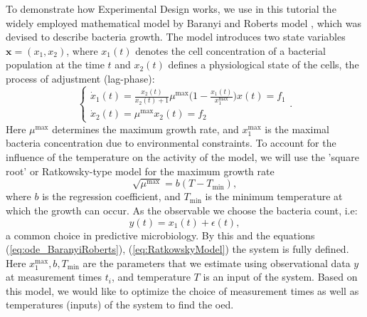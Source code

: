 \documentclass[10pt,A4paper]{article}
\newcommand{\mbx}{\mathbf{x}}
\begin{document}
To demonstrate how Experimental Design works, we use in this tutorial the widely employed mathematical model by Baranyi and Roberts model \cite{baranyiDynamicApproach1994}, which was devised to describe bacteria growth. 
The model introduces two state variables $\mbx = (x_1, x_2)$, where $x_1(t)$ denotes the cell concentration of a bacterial population at the time $t$ and $x_2(t)$ defines a physiological state of the cells, the process of adjustment (lag-phase):
\begin{equation}
    \begin{cases}
        \dot x_1(t) = \frac{x_2(t)}{x_2(t) + 1} \mu^\text{max} \big(1 - \frac{x_1(t)}{x_1^\text{max}}\big) x(t)  = f_1 \\
        \dot x_2(t) = \mu^\text{max}  x_2(t) = f_2
    \end{cases}.
    \label{eq:ode_BaranyiRoberts}
\end{equation}
Here $\mu^\text{max}$ determines the maximum growth rate, and $x_1^\text{max}$ is the maximal bacteria concentration due to environmental constraints. 
To account for the influence of the temperature on the activity of the model, we will use the 'square root' or Ratkowsky-type model for the maximum growth rate \cite{}
\begin{equation}
    \sqrt{\mu^\text{max}} = b (T - T_\text{min}),
    \label{eq:RatkowskyModel}
\end{equation} 
where $b$ is the regression coefficient, and $T_\text{min}$ is the minimum temperature at which the growth can occur. 
As the observable we choose the bacteria count, i.e:
\begin{equation}
    y(t) = x_1(t)+\epsilon(t),
 \end{equation} 
a common choice in predictive microbiology. 
By this and the equations (\ref{eq:ode_BaranyiRoberts}), (\ref{eq:RatkowskyModel}) the system is fully defined. 
Here $x_1^\text{max}, b, T_\text{min}$ are the parameters that we estimate using observational data $y$ at measurement times $t_i$, and temperature $T$ is an input of the system. 
Based on this model, we would like to optimize the choice of measurement times as well as temperatures (inputs) of the system to find the \acl{oed}.
%
\end{document}
